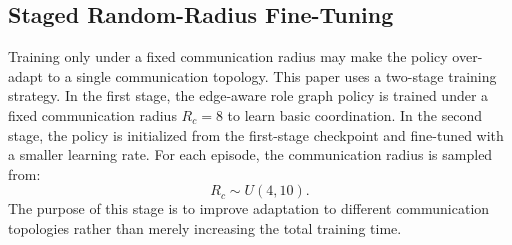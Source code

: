\subsection{Staged Random-Radius Fine-Tuning}

Training only under a fixed communication radius may make the policy over-adapt to a single communication topology. This paper uses a two-stage training strategy. In the first stage, the edge-aware role graph policy is trained under a fixed communication radius $R_c=8$ to learn basic coordination. In the second stage, the policy is initialized from the first-stage checkpoint and fine-tuned with a smaller learning rate. For each episode, the communication radius is sampled from:
\begin{equation}
R_c\sim U(4,10).
\end{equation}
The purpose of this stage is to improve adaptation to different communication topologies rather than merely increasing the total training time.
